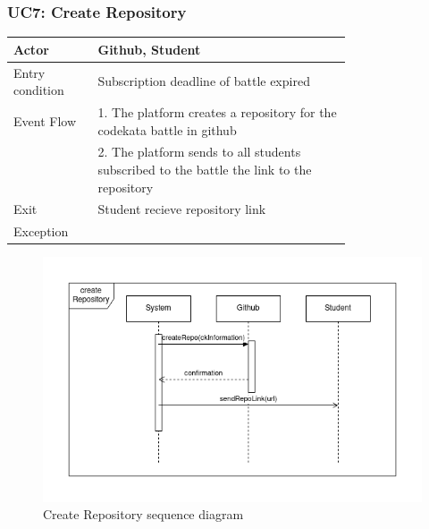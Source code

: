 \newpage
\subsubsection{UC7: Create Repository}
\begin{center}
    \begin{longtable}{lp{0.75\linewidth}}
        \hline
            Actor & Github, Student\\
        \hline
            Entry condition & Subscription deadline of battle expired\\
        \hline
            Event Flow & 1. The platform creates a repository for the codekata battle in github\\
                       & 2. The platform sends to all students subscribed to the battle the link to the repository\\
        \hline
            Exit & Student recieve repository link\\
        \hline
            Exception & \\
        \hline
    \end{longtable}
\end{center}

\begin{figure}[H]
    \centering
    \includegraphics[width=1\linewidth]{misc//Images//UC Diagrams/UC7.png}
    \caption{Create Repository sequence diagram}
    \label{fig:enter-label}
\end{figure}

\newpage
